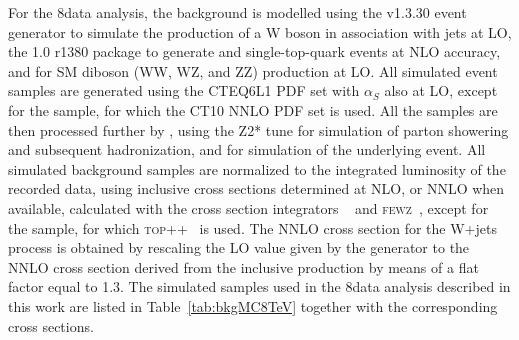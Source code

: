 For the 8\TeV data analysis, the background is modelled using the  v1.3.30 event generator to simulate the production of a W boson in association with jets at LO,
the \POWHEG{} 1.0 r1380 package to generate \ttbar and single-top-quark events at NLO accuracy, and  for SM diboson (WW, WZ, and ZZ) production at LO.
All simulated event samples are generated using the CTEQ6L1 PDF set with $\alpha_S$ also at LO, except for the \POWHEG{} \ttbar sample,
for which the CT10 NNLO PDF set is used.
All the samples are then processed further by , using the Z2* tune for simulation of parton showering and subsequent hadronization,
and for simulation of the underlying event. All simulated background samples are normalized to the integrated luminosity of the recorded data, using inclusive cross sections determined at NLO,
or NNLO when available, calculated with the cross section integrators \MCFM{}~\cite{Campbell:2003hd,Campbell:2011bn,Campbell:2012uf,Campbell:2004ch}
and \textsc{fewz}~\cite{Li:2012wna}, except for the \ttbar sample, for which \textsc{top++}~\cite{Czakon:2011xx} is used.
The NNLO cross section for the W+jets process is obtained by rescaling the LO value given by the generator to the NNLO cross section
derived from the inclusive production by means of a flat factor equal to 1.3.
The simulated samples used in the 8\TeV data analysis described in this work are listed in Table~\ref{tab:bkgMC8TeV} together with the corresponding cross sections.\\

